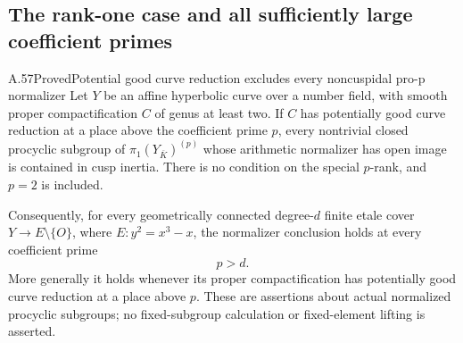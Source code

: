 \subsection{The rank-one case and all sufficiently large coefficient primes}

\begin{statement}{A.57}{Proved}{Potential good curve reduction excludes every noncuspidal pro-p normalizer}
Let \(Y\) be an affine hyperbolic curve over a number field, with
smooth proper compactification \(C\) of genus at least two.
If \(C\) has potentially good curve reduction at a place above
the coefficient prime \(p\), every nontrivial closed procyclic
subgroup of \(\pi_1(Y_{\overline K})^{(p)}\) whose arithmetic
normalizer has open image is contained in cusp inertia.
There is no condition on the special \(p\)-rank, and \(p=2\)
is included.

Consequently, for every geometrically connected degree-\(d\)
finite etale cover \(Y\to E\setminus\{O\}\), where
\(E:y^2=x^3-x\), the normalizer conclusion holds at every
coefficient prime
\[
                              p>d.                     \tag{A.57.1}
\]
More generally it holds whenever its proper compactification
has potentially good curve reduction at a place above \(p\).
These are assertions about actual normalized procyclic subgroups;
no fixed-subgroup calculation or fixed-element lifting is asserted.
\end{statement}

